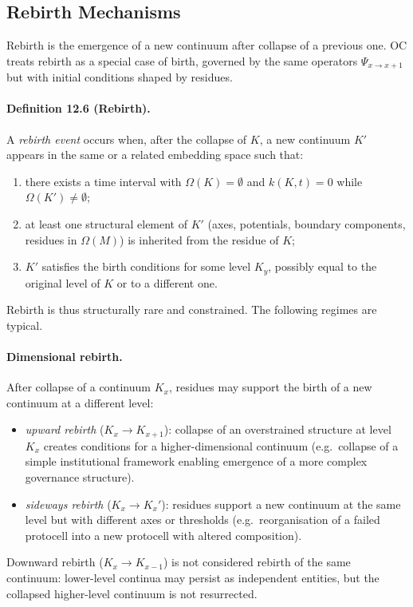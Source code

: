 \subsection{Rebirth Mechanisms}

Rebirth is the emergence of a new continuum after collapse of a previous one.
OC treats rebirth as a special case of birth, governed by the same operators
\(\Psi_{x\to x+1}\) but with initial conditions shaped by residues.

\paragraph{Definition 12.6 (Rebirth).}
A \emph{rebirth event} occurs when, after the collapse of \(K\),
a new continuum \(K'\) appears in the same or a related embedding space such
that:
\begin{enumerate}
  \item there exists a time interval with
        \(\Omega(K)=\emptyset\) and \(k(K,t)=0\) while
        \(\Omega(K')\neq\emptyset\);
  \item at least one structural element of \(K'\) (axes, potentials, boundary
        components, residues in \(\Omega(M)\)) is inherited from the residue of
        \(K\);
  \item \(K'\) satisfies the birth conditions for some level \(K_y\),
        possibly equal to the original level of \(K\) or to a different one.
\end{enumerate}

Rebirth is thus structurally rare and constrained. The following regimes
are typical.

\paragraph{Dimensional rebirth.}
After collapse of a continuum \(K_x\), residues may support the birth of a
new continuum at a different level:
\begin{itemize}
  \item \emph{upward rebirth} (\(K_x\to K_{x+1}\)):
        collapse of an overstrained structure at level \(K_x\) creates
        conditions for a higher-dimensional continuum (e.g.\ collapse of
        a simple institutional framework enabling emergence of a more complex
        governance structure).
  \item \emph{sideways rebirth} (\(K_x\to K_x'\)):
        residues support a new continuum at the same level but with different
        axes or thresholds (e.g.\ reorganisation of a failed protocell into a
        new protocell with altered composition).
\end{itemize}
Downward rebirth (\(K_x\to K_{x-1}\)) is not considered rebirth of the same
continuum: lower-level continua may persist as independent entities, but the
collapsed higher-level continuum is not resurrected.


